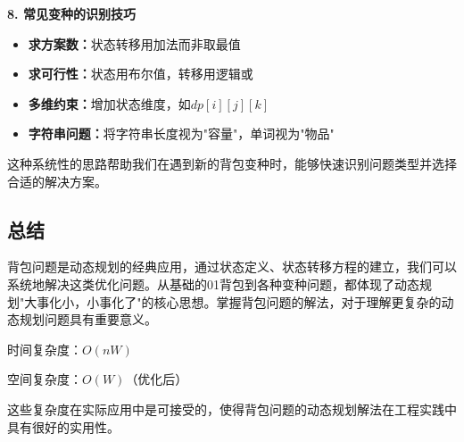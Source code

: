 \textbf{8. 常见变种的识别技巧}
\begin{itemize}
\item \textbf{求方案数：}状态转移用加法而非取最值
\item \textbf{求可行性：}状态用布尔值，转移用逻辑或
\item \textbf{多维约束：}增加状态维度，如$dp[i][j][k]$
\item \textbf{字符串问题：}将字符串长度视为"容量"，单词视为"物品"
\end{itemize}

这种系统性的思路帮助我们在遇到新的背包变种时，能够快速识别问题类型并选择合适的解决方案。

\subsection{总结}
背包问题是动态规划的经典应用，通过状态定义、状态转移方程的建立，我们可以系统地解决这类优化问题。从基础的01背包到各种变种问题，都体现了动态规划"大事化小，小事化了"的核心思想。掌握背包问题的解法，对于理解更复杂的动态规划问题具有重要意义。

时间复杂度：$O(nW)$

空间复杂度：$O(W)$（优化后）

这些复杂度在实际应用中是可接受的，使得背包问题的动态规划解法在工程实践中具有很好的实用性。



